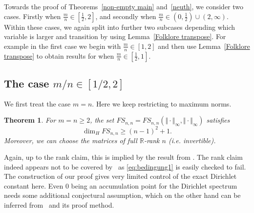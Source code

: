 \documentclass[10pt]{amsart}
\newtheorem{theorem}{Theorem}[section]
\theoremstyle{definition}
\newcommand{\R}{\mathbb{R}}
\begin{document}
Towards the proof of Theorems~\ref{non-empty main} and~\ref{neuth}, we consider two cases. Firstly when $\tfrac{m}{n}\in [\tfrac{1}{2},2]$, and secondly when $\tfrac{m}{n}\in (0,\tfrac{1}{2})\cup(2,\infty)$. 
Within these cases, we again split into further two subcases 
depending which variable is larger and transition
by using Lemma~\ref{Folklore transpose}. For example in the first case we begin with $\tfrac{m}{n}\in[1,2]$ and then use Lemma~\ref{Folklore transpose} to obtain results for when $\tfrac{m}{n}\in[\tfrac{1}{2},1]$.

\subsection{The case $m/n\in [1/2,2]$ } \label{se3.1}

We first treat the case $m=n$.
Here we keep restricting to maximum norms.

\begin{theorem}  \label{arbn}
    For $m=n\ge 2$, 
    the set $FS_{n,n}=FS_{n,n}(\Vert \cdot \Vert_{\infty},\Vert \cdot \Vert_{\infty})$ 
    satisfies
    \[
    \dim_H FS_{n,n} \ge (n-1)^2+1.
    \]
    Moreover, we can choose the matrices
    of full $\R$-rank $n$ (i.e. invertible).
\end{theorem}

 Again, up to the rank claim, this is implied by the result
from \cite{Dasetal}. 
The rank claim indeed appears not to be covered by~\cite{Dasetal}
as \eqref{eq:bedingung1} is easily checked to fail.
The construction of our proof gives very limited control of the exact Dirichlet constant here. Even $0$ being an accumulation point for the Dirichlet spectrum needs some additional conjectural assumption, which on the other hand can be inferred from~\cite[Theorem~3.15]{Dasetal} and its proof method.



\end{document}
